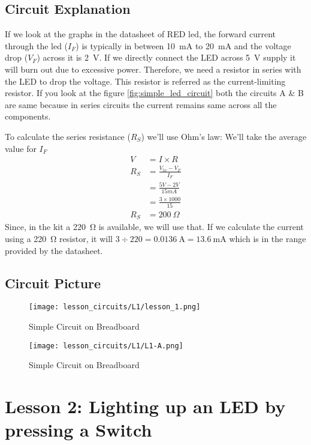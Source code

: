 \subsection{Circuit Explanation}
If we look at the graphs in the datasheet of RED led\cite{tlur640}, the forward current through the led ($I_F$) is typically 
in between \SI{10}{mA} to \SI{20}{mA} and the voltage drop ($V_F$) across it is \SI{2}{V}. If we directly connect the LED across 
\SI{5}{V} supply it will burn out due to excessive power. Therefore, we need a resistor in series with the LED to drop the voltage. 
This resistor is referred as the current-limiting resistor. If you look at the figure \ref{fig:simple_led_circuit} both the circuits 
A \& B are same because in series circuits the current remains same across all the components.

To calculate the series resistance ($R_S$) we'll use Ohm's law:
We'll take the average value for $I_F$
\begin{align*}
    V &= I \times R \\
    R_S &= \frac{V_{5v} - V_F}{I_F} \\
        &= \frac{5V - 2V}{15mA} \\
        &= \frac{3 \times 1000}{15} \\
    R_S &= \SI{200}{\Omega}
\end{align*}
Since, in the kit a \SI{220}{\ohm} is available, we will use that. If we calculate the current using a \SI{220}{\ohm} resistor, it will $3 \div 220 = \SI{0.0136}{\ampere} = \SI{13.6}{\mA}$ which is in the range provided by the datasheet.
\subsection{Circuit Picture}
\begin{figure}[htp]
    \centering
    \texttt{[image: lesson\_circuits/L1/lesson\_1.png]}
    \caption{Simple Circuit on Breadboard}
    \label{fig:sc_bb}
\end{figure}
\begin{figure}[htp]
    \centering
    \texttt{[image: lesson\_circuits/L1/L1-A.png]}
    \caption{Simple Circuit on Breadboard}
    \label{fig:sc_obb}
\end{figure}



\section{Lesson 2: Lighting up an LED by pressing a Switch}

